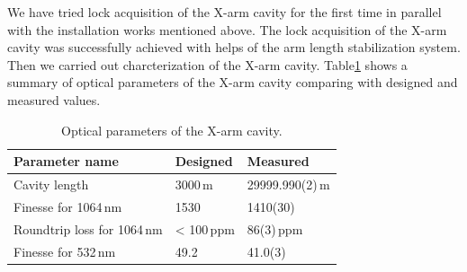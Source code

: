 We have tried lock acquisition of the X-arm cavity for the first time in parallel with the installation works mentioned above. The lock acquisition of the X-arm cavity was successfully achieved with helps of the arm length stabilization system. Then we carried out charcterization of the X-arm cavity. Table\ref{table:xarm} shows a summary of optical parameters of the X-arm cavity comparing with designed and measured values. 

\begin{table} 
\begin{center} 
 \caption{\label{table:xarm}Optical parameters of the X-arm cavity\cite{xarm_com}.}
 \begin{tabular}{lll}
 Parameter name & Designed & Measured \\ \hline
 Cavity length & 3000\,m & 29999.990(2)\,m \\
 Finesse for 1064\,nm & 1530 & 1410(30) \\
Roundtrip loss for 1064\,nm & < 100\,ppm & 86(3)\,ppm \\
Finesse for 532\,nm & 49.2 & 41.0(3) \\ \hline 
\end{tabular}
\end{center} 
 \end{table}






